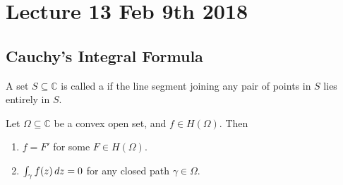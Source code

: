 \documentclass[notoc,notitlepage]{tufte-book}
\begin{document}


\chapter{Lecture 13 Feb 9th 2018}
	\label{chapter:lecture_13_feb_9th_2018}

\section{Cauchy's Integral Formula} %
\label{sec:cauchy_s_integral_formula}

\begin{defn}\label{defn:convex_set}
	A set $S \subseteq \mathbb{C}$ is called a  if the line segment joining any pair of points in $S$ lies entirely in $S$.
\end{defn}

\begin{thm}\label{thm:cauchy_s_theorem_for_convex_set}
	Let $\Omega \subseteq \mathbb{C}$ be a convex open set, and $f \in H(\Omega)$. Then
	\begin{enumerate}
	 	\item $f = F'$ for some $F \in H(\Omega)$.
	 	\item $\int_{\gamma} f(z) \mathop{}\!d{z} = 0$ for any closed path $\gamma \in \Omega$.
	 \end{enumerate} 
\end{thm}
\end{document}
